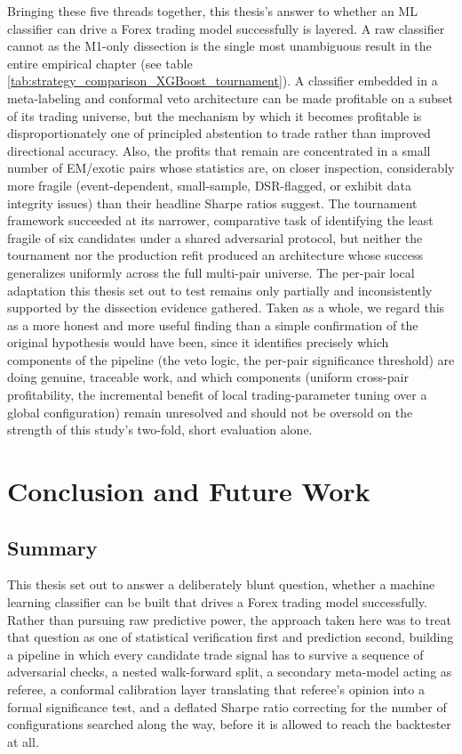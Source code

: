 \documentclass[12pt, a4paper]{article}
\begin{document}
Bringing these five threads together, this thesis's answer to whether an ML classifier can drive a Forex trading model successfully is layered. A raw classifier cannot as the M1-only 
dissection is the single most unambiguous result in the entire empirical chapter (see table \ref{tab:strategy_comparison_XGBoost_tournament}). A classifier embedded in a meta-labeling 
and conformal veto architecture can be made profitable on a subset of its trading universe, but the mechanism by which it becomes profitable is disproportionately one of principled 
abstention to trade rather than improved directional accuracy. Also, the profits that remain are concentrated in a small number of EM/exotic pairs whose statistics are, on closer 
inspection, considerably more fragile (event-dependent, small-sample, DSR-flagged, or exhibit data integrity issues) than their headline Sharpe ratios suggest. The tournament 
framework succeeded at its narrower, comparative task of identifying the least fragile of six candidates under a shared adversarial protocol, but neither the tournament nor the 
production refit produced an architecture whose success generalizes uniformly across the full multi-pair universe. The per-pair local adaptation this thesis set out to test remains 
only partially and inconsistently supported by the dissection evidence gathered. Taken as a whole, we regard this as a more honest and more useful finding than a simple confirmation 
of the original hypothesis would have been, since it identifies precisely which components of the pipeline (the veto logic, the per-pair significance threshold) are doing genuine, 
traceable work, and which components (uniform cross-pair profitability, the incremental benefit of local trading-parameter tuning over a global configuration) remain unresolved and 
should not be oversold on the strength of this study's two-fold, short evaluation alone.

\section{Conclusion and Future Work}
\subsection{Summary}

This thesis set out to answer a deliberately blunt question, whether a machine learning classifier can be built that drives a Forex trading model successfully. Rather than pursuing 
raw predictive power, the approach taken here was to treat that question as one of statistical verification first and prediction second, building a pipeline in which every candidate 
trade signal has to survive a sequence of adversarial checks, a nested walk-forward split, a secondary meta-model acting as referee, a conformal calibration layer 
translating that referee's opinion into a formal significance test, and a deflated Sharpe ratio correcting for the number of configurations searched along the way, before it is 
allowed to reach the backtester at all.
\end{document}
